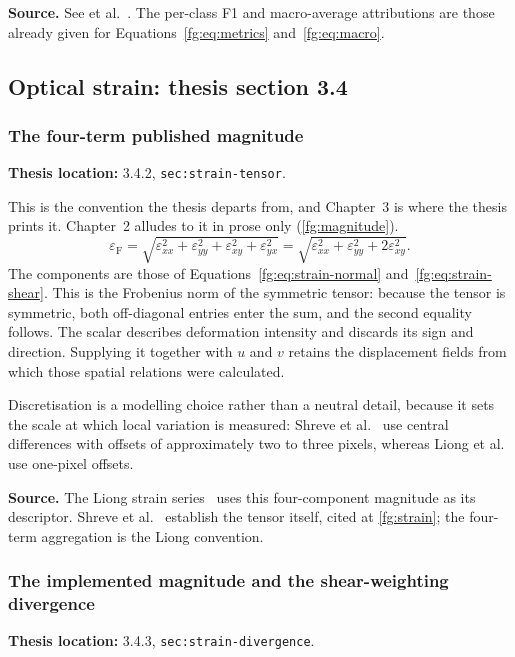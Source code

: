 \documentclass[11pt,a4paper]{article}
\numberwithin{equation}{section}
\begin{document}
\textbf{Source.} See et al.~\cite{see2019}. The per-class F1 and macro-average
attributions are those already given for Equations~\eqref{fg:eq:metrics}
and~\eqref{fg:eq:macro}.

\subsection{Optical strain: thesis section 3.4}

\subsubsection{The four-term published magnitude}
\label{fg:frobenius}
\textbf{Thesis location:} 3.4.2, \texttt{sec:strain-tensor}.

This is the convention the thesis departs from, and Chapter~3 is where the
thesis prints it. Chapter~2 alludes to it in prose only
(\autoref{fg:magnitude}).
\begin{equation}
    \varepsilon_{\mathrm{F}}
    =\sqrt{\varepsilon_{xx}^{2}+\varepsilon_{yy}^{2}
        +\varepsilon_{xy}^{2}+\varepsilon_{yx}^{2}}
    =\sqrt{\varepsilon_{xx}^{2}+\varepsilon_{yy}^{2}
        +2\varepsilon_{xy}^{2}}.
    \label{fg:eq:frobenius}
\end{equation}
The components are those of Equations~\eqref{fg:eq:strain-normal}
and~\eqref{fg:eq:strain-shear}. This is the Frobenius norm of the symmetric
tensor: because the tensor is symmetric, both off-diagonal entries enter the
sum, and the second equality follows. The scalar describes deformation
intensity and discards its sign and direction. Supplying it together with $u$
and $v$ retains the displacement fields from which those spatial relations
were calculated.

Discretisation is a modelling choice rather than a neutral detail, because it
sets the scale at which local variation is measured: Shreve et
al.~\cite{shreve2011} use central differences with offsets of approximately
two to three pixels, whereas Liong et al.~\cite{liong2014a} use one-pixel
offsets.

\textbf{Source.} The Liong strain series~\cite{liong2014a,liong2014b,liong2016}
uses this four-component magnitude as its descriptor. Shreve et
al.~\cite{shreve2011} establish the tensor itself, cited at
\autoref{fg:strain}; the four-term aggregation is the Liong convention.

\subsubsection{The implemented magnitude and the shear-weighting divergence}
\label{fg:strain-divergence}
\textbf{Thesis location:} 3.4.3, \texttt{sec:strain-divergence}.
\end{document}
